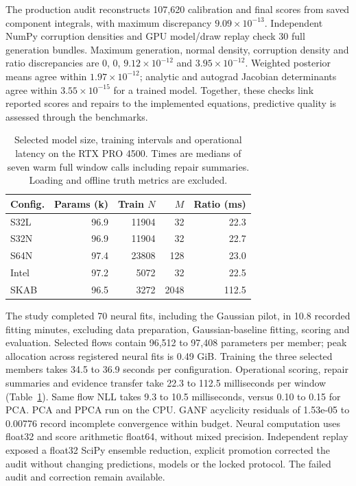 \documentclass{llncs}
\newcommand{\1}{\mathbf{1}}
\newcommand{\AuditCandidates}{107,620}
\newcommand{\AuditMaximum}{$9.09\times10^{-13}$}
\newcommand{\ReplayDensity}{0}
\newcommand{\ReplayGeneration}{0}
\newcommand{\ReplayCorruption}{$9.12\times10^{-12}$}
\newcommand{\ReplayRatio}{$3.95\times10^{-12}$}
\newcommand{\ReplayPosterior}{$1.97\times10^{-12}$}
\newcommand{\ReplayJacobian}{$3.55\times10^{-15}$}
\newcommand{\ReplayBundles}{30}
\begin{document}
The production audit reconstructs \AuditCandidates{} calibration and final scores from saved component integrals, with maximum discrepancy \AuditMaximum. Independent NumPy corruption densities and GPU model/draw replay check \ReplayBundles{} full generation bundles. Maximum generation, normal density, corruption density and ratio discrepancies are \ReplayGeneration, \ReplayDensity, \ReplayCorruption{} and \ReplayRatio. Weighted posterior means agree within \ReplayPosterior; analytic and autograd Jacobian determinants agree within \ReplayJacobian{} for a trained model. Together, these checks link reported scores and repairs to the implemented equations, predictive quality is assessed through the benchmarks.

\begin{table}[!tbp]
\centering
\caption{Selected model size, training intervals and operational latency on the RTX PRO 4500. Times are medians of seven warm full window calls including repair summaries. Loading and offline truth metrics are excluded.}
\label{tab:runtime}
\small
\begin{tabular}{lrrrr}
\toprule
Config. & Params (k) & Train $N$ & $M$ & Ratio (ms) \\
\midrule
S32L & 96.9 & 11904 & 32 & 22.3 \\
S32N & 96.9 & 11904 & 32 & 22.7 \\
S64N & 97.4 & 23808 & 128 & 23.0 \\
Intel & 97.2 & 5072 & 32 & 22.5 \\
SKAB & 96.5 & 3272 & 2048 & 112.5 \\
\bottomrule
\end{tabular}
\end{table}
The study completed 70 neural fits, including the Gaussian pilot, in 10.8 recorded fitting minutes, excluding data preparation, Gaussian-baseline fitting, scoring and evaluation. Selected flows contain 96,512 to 97,408 parameters per member; peak allocation across registered neural fits is 0.49 GiB. Training the three selected members takes 34.5 to 36.9 seconds per configuration. Operational scoring, repair summaries and evidence transfer take 22.3 to 112.5 milliseconds per window (Table~\ref{tab:runtime}). Same flow NLL takes 9.3 to 10.5 milliseconds, versus 0.10 to 0.15 for PCA. PCA and PPCA run on the CPU. GANF acyclicity residuals of 1.53e-05 to 0.00776 record incomplete convergence within budget. Neural computation uses float32 and score arithmetic float64, without mixed precision. Independent replay exposed a float32 SciPy ensemble reduction, explicit promotion corrected the audit without changing predictions, models or the locked protocol. The failed audit and correction remain available.
\end{document}
